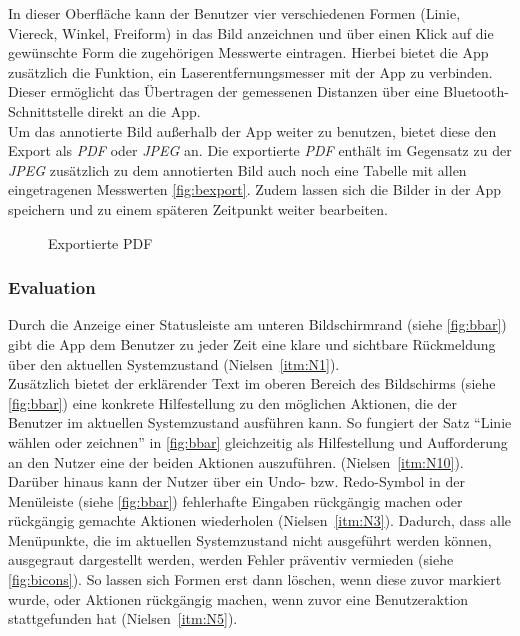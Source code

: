 In dieser Oberfläche kann der Benutzer vier verschiedenen Formen (Linie, Viereck, Winkel, Freiform) in das Bild anzeichnen und über einen Klick auf die gewünschte Form die zugehörigen Messwerte eintragen.
Hierbei bietet die App zusätzlich die Funktion, ein Laserentfernungsmesser mit der App zu verbinden.
Dieser ermöglicht das Übertragen der gemessenen Distanzen über eine Bluetooth-Schnittstelle direkt an die App. \\

Um das annotierte Bild außerhalb der App weiter zu benutzen, bietet diese den Export als \emph{PDF} oder \emph{JPEG} an.
Die exportierte \emph{PDF} enthält im Gegensatz zu der \emph{JPEG} zusätzlich zu dem annotierten Bild auch noch eine Tabelle mit allen eingetragenen Messwerten \autoref{fig:bexport}. 
Zudem lassen sich die Bilder in der App speichern und zu einem späteren Zeitpunkt weiter bearbeiten.

\begin{figure}[h]
  \centering
  \caption{Exportierte PDF}\label{fig:bexport}
\end{figure}

\subsubsection{Evaluation}
Durch die Anzeige einer Statusleiste am unteren Bildschirmrand (siehe \autoref{fig:bbar}) gibt die App dem Benutzer zu jeder Zeit eine klare und sichtbare Rückmeldung über den aktuellen Systemzustand (Nielsen~\autoref{itm:N1}). \\

Zusätzlich bietet der erklärender Text im oberen Bereich des Bildschirms (siehe \autoref{fig:bbar}) eine konkrete Hilfestellung zu den möglichen Aktionen, die der Benutzer im aktuellen Systemzustand ausführen kann.
So fungiert der Satz ``Linie wählen oder zeichnen'' in \autoref{fig:bbar} gleichzeitig als Hilfestellung und Aufforderung an den Nutzer eine der beiden Aktionen auszuführen.
(Nielsen~\autoref{itm:N10}). \\

Darüber hinaus kann der Nutzer über ein Undo- bzw. Redo-Symbol in der Menüleiste (siehe \autoref{fig:bbar}) fehlerhafte Eingaben rückgängig machen oder rückgängig gemachte Aktionen wiederholen (Nielsen~\autoref{itm:N3}).
Dadurch, dass alle Menüpunkte, die im aktuellen Systemzustand nicht ausgeführt werden können, ausgegraut dargestellt werden, werden Fehler präventiv vermieden (siehe \autoref{fig:bicons}).
So lassen sich Formen erst dann löschen, wenn diese zuvor markiert wurde, oder Aktionen rückgängig machen, wenn zuvor eine Benutzeraktion stattgefunden hat (Nielsen~\autoref{itm:N5}). \\

